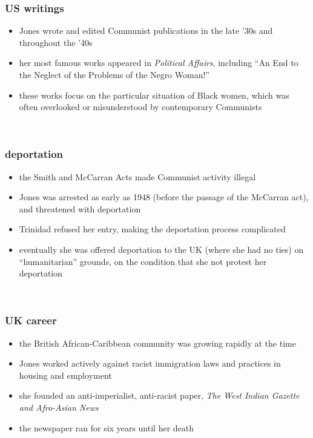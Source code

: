 \documentclass{beamer} %
\theoremstyle{definition} %
\begin{document}
\begin{frame} 
	\frametitle{US writings}
	\begin{itemize}
		\item Jones wrote and edited Communist publications in the late '30s and throughout the '40s
		\item her most famous works appeared in \emph{Political Affairs}, including ``An End to the Neglect of the Problems of the Negro Woman!'' \citep{Jones49a}
		\item these works focus on the particular situation of Black women, which was often overlooked or misunderstood by contemporary Communists
	\end{itemize}

	\vfill
	\ \hfill \citep{Davies08}
\end{frame}

\begin{frame} 
	\frametitle{deportation}
	\begin{itemize}
		\item the Smith and McCarran Acts made Communist activity illegal
		\item Jones was arrested as early as 1948 (before the passage of the McCarran act), and threatened with deportation
		\item Trinidad refused her entry, making the deportation process complicated
		\item eventually she was offered deportation to the UK (where she had no ties) on ``humanitarian'' grounds, on the condition that she not protest her deportation
	\end{itemize}

	\vfill
	\ \hfill \citep{Davies08}
\end{frame}

\begin{frame} 
	\frametitle{UK career}
	\begin{itemize}
		\item the British African-Caribbean community was growing rapidly at the time
		\item Jones worked actively against racist immigration laws and practices in housing and employment
		\item she founded an anti-imperialist, anti-racist paper, \emph{The West Indian Gazette and Afro-Asian News}
		\item the newspaper ran for six years until her death
	\end{itemize}

	\vfill
	\ \hfill \citep{Davies08}
\end{frame}
\end{document}

